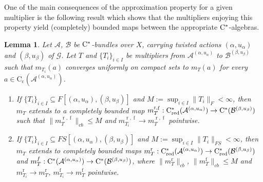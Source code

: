 \documentclass[11 pt, leqno]{amsart}
\numberwithin{equation}{section}
\theoremstyle{plain}
\newtheorem {lem} [thm]{Lemma}
\theoremstyle{definition}
\newcommand*{\contc}{\mathrm{C_c}}%
\DeclareMathOperator{\red}{red}%
\DeclareMathOperator{\rd}{r}%
\DeclareMathOperator{\f}{f}%
\newcommand{\B}{\mathcal B}
\newcommand{\m}{m}
\newcommand{\G}{\mathcal G} %
\newcommand{\A}{\mathcal A}
\newcommand{\cst}{\ifmmode\mathrm{C}^*\else{$\mathrm{C}^*$}\fi}
\begin{document}
One of the main consequences of the approximation property for a given multiplier is the following result which shows that the multipliers enjoying this property yield (completely) bounded maps between the appropriate $\cst$-algebras.

\begin{lem}\label{lem:weak_approx_implies_reduced_to_full}
Let $\A$, $\B$ be $\cst$-bundles over $X$, carrying twisted actions $(\alpha,u_\alpha)$ and $(\beta,u_\beta)$ of $\G$. 
Let $T$ and $\{T_{i}\}_{i\in I}$ be multipliers from $\A^{(\alpha,u_{\alpha})}$ to $\B^{(\beta,u_{\beta})}$ such that $\m_{T_i}(a)$ converges uniformly on compact sets to $\m_{T}(a)$  for every $a\in\contc(\A^{(\alpha,u_{\alpha})})$. 
\begin{enumerate}
    \item\label{ite:weak_approx_implies_reduced_to_full1} If $\{ T_{i} \}_{i\in I} \subseteq F[(\alpha,u_{\alpha}), (\beta,u_{\beta})]$ and $M := \sup_{i\in I} \|T_i\|_{F} < \infty$, then $\m_{T}$ extends to a completely bounded map $\m_T^{\rd,\f} : \cst_{\red}(\A^{(\alpha,u_{\alpha})})\to \cst(\B^{(\beta,u_{\beta})})$ such that $\| \m_T^{\rd,\f} \|_{cb} \leq M$ and $\m_{T_i}^{\rd,\f} \to \m_T^{\rd,\f}$ pointwise. 
    
    \item\label{ite:weak_approx_implies_reduced_to_full2} If $\{ T_{i} \}_{i\in I} \subseteq FS[(\alpha,u_{\alpha}), (\beta,u_{\beta})]$ and $M := \sup_{i\in I} \|T_i\|_{FS}< \infty$, then $\m_{T}$ extends to completely bounded maps $\m_T^{\rd} : \cst_{\red}(\A^{(\alpha,u_{\alpha})}) \to \cst_{\red}(\B^{(\beta,u_{\beta})})$ and $\m_T^{f} : \cst(\A^{(\alpha,u_{\alpha})}) \to \cst(\B^{(\beta,u_{\beta})})$, where $\| \m_T^{\rd} \|_{cb}$, $\| \m_T^{\f} \|_{cb} \leq M$ and $\m_{T_i}^{\rd}\to \m_T^{\rd}$, $\m_{T_i}^{\f}\to \m_T^{\f}$ pointwise.
\end{enumerate}
\end{lem}
\end{document}
